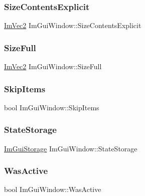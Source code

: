 \subsubsection{\texorpdfstring{Size\+Contents\+Explicit}{SizeContentsExplicit}}
{\footnotesize\ttfamily \hyperlink{struct_im_vec2}{Im\+Vec2} Im\+Gui\+Window\+::\+Size\+Contents\+Explicit}

\hypertarget{struct_im_gui_window_ac3c7eb6b9cd556d56210cbb37caf0c74}{}\label{struct_im_gui_window_ac3c7eb6b9cd556d56210cbb37caf0c74} 
\subsubsection{\texorpdfstring{Size\+Full}{SizeFull}}
{\footnotesize\ttfamily \hyperlink{struct_im_vec2}{Im\+Vec2} Im\+Gui\+Window\+::\+Size\+Full}

\hypertarget{struct_im_gui_window_ac620c64ec2897561f719db266f5e9b05}{}\label{struct_im_gui_window_ac620c64ec2897561f719db266f5e9b05} 
\subsubsection{\texorpdfstring{Skip\+Items}{SkipItems}}
{\footnotesize\ttfamily bool Im\+Gui\+Window\+::\+Skip\+Items}

\hypertarget{struct_im_gui_window_a2151ab67f2624bd606883ad346179486}{}\label{struct_im_gui_window_a2151ab67f2624bd606883ad346179486} 
\subsubsection{\texorpdfstring{State\+Storage}{StateStorage}}
{\footnotesize\ttfamily \hyperlink{struct_im_gui_storage}{Im\+Gui\+Storage} Im\+Gui\+Window\+::\+State\+Storage}

\hypertarget{struct_im_gui_window_ab346ec3a2f305948af05ec1871610a8f}{}\label{struct_im_gui_window_ab346ec3a2f305948af05ec1871610a8f} 
\subsubsection{\texorpdfstring{Was\+Active}{WasActive}}
{\footnotesize\ttfamily bool Im\+Gui\+Window\+::\+Was\+Active}

